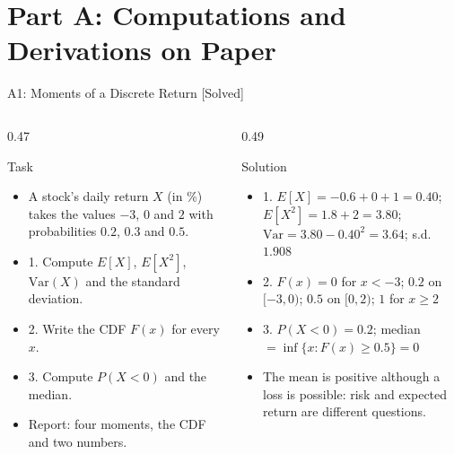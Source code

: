 \section{Part A: Computations and Derivations on Paper}

\begin{frame}{A1: Moments of a Discrete Return [Solved]}
\itemsize{\footnotesize}
\begin{columns}[T]
\begin{column}{0.47\textwidth}
\begin{block}{Task}
\begin{itemize}
    \item A stock's daily return $X$ (in \%) takes the values $-3$, $0$ and $2$ with probabilities $0.2$, $0.3$ and $0.5$.
    \item 1. Compute $E[X]$, $E[X^2]$, $\text{Var}(X)$ and the standard deviation.
    \item 2. Write the CDF $F(x)$ for every $x$.
    \item 3. Compute $P(X < 0)$ and the median.
    \item Report: four moments, the CDF and two numbers.
\end{itemize}
\end{block}
\end{column}
\begin{column}{0.49\textwidth}
\begin{exampleblock}{Solution}
\begin{itemize}
    \item 1. $E[X] = -0.6 + 0 + 1 = 0.40$; $E[X^2] = 1.8 + 2 = 3.80$; $\text{Var} = 3.80 - 0.40^2 = 3.64$; s.d. $1.908$
    \item 2. $F(x) = 0$ for $x < -3$; $0.2$ on $[-3, 0)$; $0.5$ on $[0, 2)$; $1$ for $x \ge 2$
    \item 3. $P(X < 0) = 0.2$; median $= \inf\{x : F(x) \ge 0.5\} = 0$
    \item The mean is positive although a loss is possible: risk and expected return are different questions.
\end{itemize}
\end{exampleblock}
\end{column}
\end{columns}
\end{frame}

